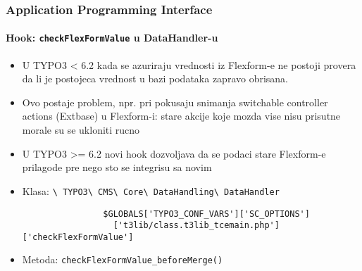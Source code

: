 \begin{frame}[fragile]
	\frametitle{Application Programming Interface}
	\framesubtitle{Hook: \texttt{checkFlexFormValue} u DataHandler-u}

	\begin{itemize}
		\item U TYPO3 < 6.2 kada se azuriraju vrednosti iz Flexform-e ne postoji provera da li je postojeca vrednost u bazi podataka zapravo obrisana.
		\item Ovo postaje problem, npr. pri pokusaju snimanja switchable controller actions (Extbase) u Flexform-i: stare akcije koje mozda vise nisu prisutne morale su se ukloniti rucno

		\item U TYPO3 >= 6.2 novi hook dozvoljava da se podaci stare Flexform-e prilagode pre nego sto se integrisu sa novim
		\item Klasa:\newline
			\smaller
				\texttt{\textbackslash
					TYPO3\textbackslash
					CMS\textbackslash
					Core\textbackslash
					DataHandling\textbackslash
					DataHandler}\normalsize

			\lstset{
				basicstyle=\smaller\ttfamily
			}

			\begin{lstlisting}
				$GLOBALS['TYPO3_CONF_VARS']['SC_OPTIONS']
				  ['t3lib/class.t3lib_tcemain.php']['checkFlexFormValue']
			\end{lstlisting}

		\item Metoda:\newline
			\smaller
				\texttt{checkFlexFormValue\_beforeMerge()}

	\end{itemize}

\end{frame}


